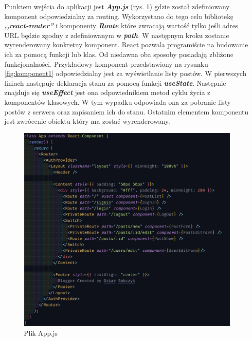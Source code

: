 \documentclass[declaration,shortabstract]{iithesis}
\begin{document}
Punktem wejścia do aplikacji jest \textbf{\textit{App.js}} (rys. \ref{fig:app.js}) gdzie został zdefiniowany komponent odpowiedzialny za routing. Wykorzystano do tego celu bibliotekę \textbf{\textit{,,react-router''}} i komponenty \textbf{\textit{Route}} które zwracają wartość tylko jeśli adres URL będzie zgodny z zdefiniowanym w \textbf{\textit{path}}. W następnym kroku zostanie wyrenderowany konkretny komponent. React pozwala programiście na budowanie ich za pomocą funkcji lub klas. Od niedawna oba sposoby posiadają zbliżone funkcjonalności. Przykładowy komponent przedstawiony na rysunku  \ref{fig:komponent1} odpowiedzialny jest za wyświetlanie listy postów. W pierwszych liniach następuje deklaracja stanu za pomocą funkcji \textbf{\textit{useState}}. Następnie znajduje się \textbf{\textit{useEffect}} jest ona odpowiednikiem metod cyklu życia z komponentów klasowych. W tym wypadku odpowiada ona za pobranie listy postów z serwera oraz zapisaniem ich do stanu. Ostatnim elementem komponentu jest zwrócenie obiektu który ma zostać wyrenderowany.
\begin{figure}
    \centering
    \includegraphics[width=\textwidth]{images/appjs.png}
    \caption{Plik App.js}
    \label{fig:app.js}
\end{figure}
\end{document}
